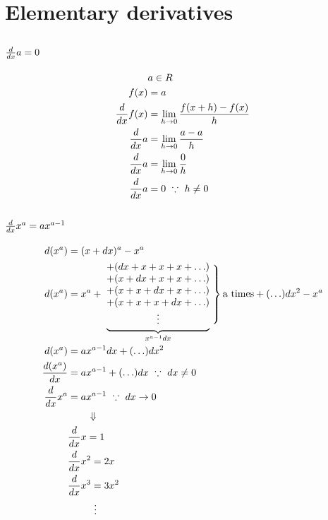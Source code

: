 \documentclass[a4paper,14pt,twoside]{book}
\begin{document}
{\section{Elementary derivatives}
\subsection{$\frac{d}{dx} a = 0$}
\begin{align*}
	&a \in R \\
	f(x)    &= a                               \\
	\frac{d}{dx} f(x) &= \lim_{h \to 0} \frac{f(x+h) - f(x)}{h} \\
	\frac{d}{dx} a    &= \lim_{h \to 0} \frac{a-a}{h}           \\
	\frac{d}{dx} a    &= \lim_{h \to 0} \frac{0}{h}             \\
	\frac{d}{dx} a    &= 0 \  \because \  h \ne 0
\end{align*}
\subsection{$\frac{d}{dx} x^a = ax^{a-1}$}
\begin{align*}
	d(x^a)        &= (x+dx)^a - x^a \\
	d(x^a)        &= x^a
	+ \  \underbrace{\begin{matrix}
			+ (dx + x + x + x + \ldots) \\
			+ (x + dx + x + x + \ldots) \\
			+ (x + x + dx + x + \ldots) \\
			+ (x + x + x + dx + \ldots) \\
			\vdots
		\end{matrix}}_{x^{a-1}dx}
	\left. \phantom{\begin{matrix} \\ \\ \\ \\ \\ \end{matrix}} \right\}
	\T{a times}
	+ (\ldots)dx^2
	- x^a \\
	d(x^a)        &= ax^{a-1}dx + (\ldots)dx^2 \\
	\DD{(x^a)}{x} &= ax^{a-1} + (\ldots)dx \  \because \  dx \ne 0 \\
	\D x^a        &= ax^{a-1} \  \because \  dx \to 0 \\
	& \qquad \Downarrow \\
	& \D x = 1 \\
	& \D x^2 = 2x \\
	& \D x^3 = 3x^2 \\
	& \qquad \  \  \vdots \\
\end{align*}
}
\end{document}
